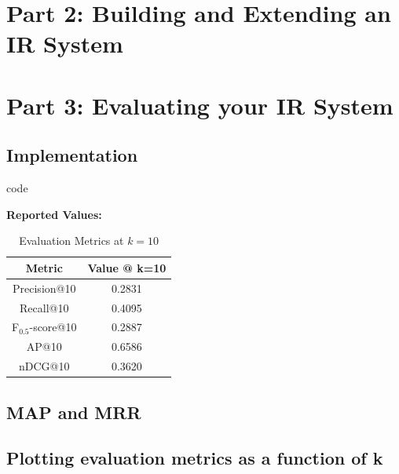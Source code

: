 \documentclass{article}
\begin{document}
\section{Part 2: Building and Extending an IR System}
\section{Part 3: Evaluating your IR System}

\subsection{Implementation}

code 

\textbf{Reported Values:}
\begin{table}[h]
\centering
\begin{tabular}{|c|c|}
\hline
\textbf{Metric} & \textbf{Value @ k=10} \\
\hline
Precision@10 & 0.2831 \\
Recall@10 & 0.4095 \\
F$_{0.5}$-score@10 & 0.2887 \\
AP@10 & 0.6586 \\
nDCG@10 & 0.3620 \\
\hline
\end{tabular}
\caption{Evaluation Metrics at $k=10$}
\end{table}

\subsection{MAP and MRR}


\subsection{Plotting evaluation metrics as a function of k}
\end{document}
